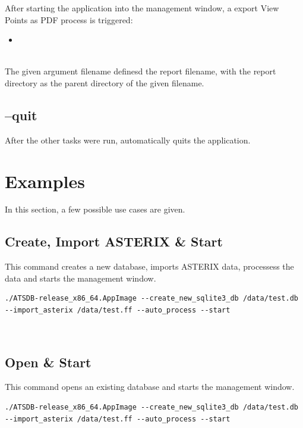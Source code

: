 After starting the application into the management window, a export View Points as PDF process is triggered:

\begin{itemize}
 \item {}
\end{itemize}
\ \\

The given argument filename definesd the report filename, with the report directory as the parent directory of the given filename.


\subsection{--quit}

After the other tasks were run, automatically quits the application.

\section{Examples}

In this section, a few possible use cases are given.

\subsection{Create, Import ASTERIX \& Start}

This command creates a new database, imports ASTERIX data, processess the data and starts the management window.

\begin{lstlisting}
./ATSDB-release_x86_64.AppImage --create_new_sqlite3_db /data/test.db --import_asterix /data/test.ff --auto_process --start
\end{lstlisting}
\ \\

\subsection{Open \& Start}

This command opens an existing database and starts the management window.

\begin{lstlisting}
./ATSDB-release_x86_64.AppImage --create_new_sqlite3_db /data/test.db --import_asterix /data/test.ff --auto_process --start
\end{lstlisting}
\ \\

